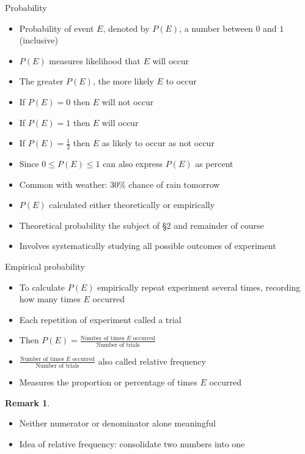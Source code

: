 \documentclass[handout]{beamer}
\theoremstyle{definition}
\newtheorem{remark}{Remark}
\begin{document}
\begin{frame}{Probability}
\begin{itemize}
\item \alert{Probability of event $E$}, denoted by $P\left(E\right)$,
a number between $0$ and $1$ (inclusive)
\item $P\left(E\right)$ measures likelihood that $E$ will occur
\item The greater $P\left(E\right)$, the more likely $E$ to occur
\item If $P\left(E\right)=0$ then $E$ will not occur
\item If $P\left(E\right)=1$ then $E$ will occur
\item If $P\left(E\right)=\frac{1}{2}$ then $E$ 
as likely to occur as not occur
\item Since $0\le P\left(E\right)\le 1$ can also express
$P\left(E\right)$ as percent
\item Common with weather: \alert{$30\%$ chance of rain tomorrow}
\item $P\left(E\right)$ calculated either \alert{theoretically}
or \alert{empirically}
\item Theoretical probability the subject of \S2 and remainder of course
\item Involves systematically studying all possible outcomes of experiment
\end{itemize}
\end{frame}

\begin{frame}{Empirical probability}
\begin{itemize}
\item To calculate $P\left(E\right)$ \alert{empirically}
repeat experiment several times, recording how
many times $E$ occurred
\item Each repetition of experiment called a \alert{trial}
\item Then $P\left(E\right)=
\frac{\text{Number of times $E$ occurred}}
{\text{Number of trials}}$
\item $\frac{\text{Number of times $E$ occurred}}
{\text{Number of trials}}$ also called
\alert{relative frequency}
\item Measures the \alert{proportion} or \alert{percentage}
of times $E$ occurred
\end{itemize}
\begin{remark}
\begin{itemize}
\item Neither numerator or denominator alone meaningful
\item Idea of relative frequency: consolidate two numbers into one
\end{itemize}
\end{remark}
\end{frame}
\end{document}
